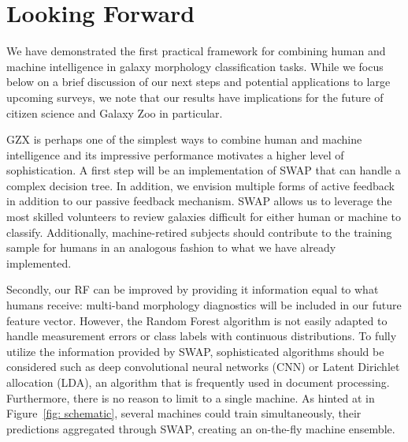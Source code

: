\section{Looking Forward}\label{chap4: visions}

We have demonstrated the first practical framework for combining human and machine
 intelligence in galaxy morphology classification tasks. 
While we focus below on a brief discussion of our next steps and potential applications
to large upcoming surveys, we note that our results have implications for the future
of citizen science and Galaxy Zoo in particular. 


GZX is perhaps one of the simplest ways to combine human and machine intelligence
 and its impressive performance motivates a higher level of sophistication. 
A first step will be an implementation of SWAP that can handle a complex decision tree. 
In addition, we envision multiple forms of active feedback in addition to 
our passive feedback mechanism.  SWAP allows us to leverage the 
most skilled volunteers to review galaxies difficult for either
 human or machine to classify.  Additionally, machine-retired subjects should 
contribute to the training sample for humans in an analogous fashion to what 
we have already implemented. 


Secondly, our RF can be improved by providing it information equal to what
humans receive: multi-band morphology diagnostics will be
included in our future feature vector.  However, the Random Forest algorithm is not 
easily adapted to handle measurement errors or class labels with continuous distributions. 
To fully utilize the information provided by SWAP, sophisticated algorithms should be considered such as 
deep convolutional neural networks (CNN) or Latent Dirichlet allocation (LDA), 
an algorithm that is frequently used in document processing.  
Furthermore, there is no reason to limit to a single machine. 
As hinted at in Figure~\ref{fig: schematic}, several machines could train simultaneously, 
their predictions aggregated through SWAP, creating an on-the-fly machine ensemble.



